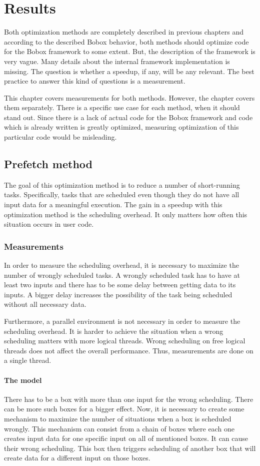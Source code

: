 \chapter{Results}
Both optimization methods are completely described in previous chapters and according to the described Bobox behavior, both methods should optimize code for the Bobox framework to some extent. But, the description of the framework is very vague. Many details about the internal framework implementation is missing. The question is whether a speedup, if any, will be any relevant. The best practice to answer this kind of questions is a measurement.

This chapter covers measurements for both methods. However, the chapter covers them separately. There is a specific use case for each method, when it should stand out. Since there is a lack of actual code for the Bobox framework and code which is already written is greatly optimized, measuring optimization of this particular code would be misleading.

\section{Prefetch method}
\label{results-prefetch}
The goal of this optimization method is to reduce a number of short-running tasks. Specifically, tasks that are scheduled even though they do not have all input data for a meaningful execution. The gain in a speedup with this optimization method is the scheduling overhead. It only matters how often this situation occurs in user code.

\subsection{Measurements}
In order to measure the scheduling overhead, it is necessary to maximize the number of wrongly scheduled tasks. A wrongly scheduled task has to have at least two inputs and there has to be some delay between getting data to its inputs. A bigger delay increases the possibility of the task being scheduled without all necessary data.

Furthermore, a parallel environment is not necessary in order to measure the scheduling overhead. It is harder to achieve the situation when a wrong scheduling matters with more logical threads. Wrong scheduling on free logical threads does not affect the overall performance. Thus, measurements are done on a single thread.

\subsubsection{The model}
There has to be a box with more than one input for the wrong scheduling. There can be more such boxes for a bigger effect. Now, it is necessary to create some mechanism to maximize the number of situations when a box is scheduled wrongly. This mechanism can consist from a chain of boxes where each one creates input data for one specific input on all of mentioned boxes. It can cause their wrong scheduling. This box then triggers scheduling of another box that will create data for a different input on those boxes.


